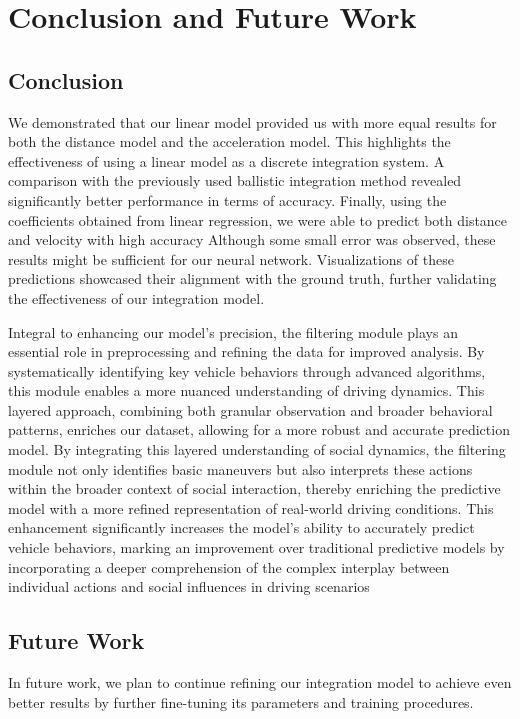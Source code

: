 \section{Conclusion and Future Work}

\subsection{Conclusion}
We demonstrated that our linear model provided us with more equal results for both the distance model and 
the acceleration model.
This highlights the effectiveness of using a linear model as a discrete integration system.
A comparison with the previously used ballistic integration method revealed significantly better performance in terms of accuracy.
Finally, using the coefficients obtained from linear regression, 
we were able to predict both distance and velocity with high accuracy
Although some small error was observed, these results might be sufficient for our neural network.
Visualizations of these predictions showcased their alignment with the ground truth, further validating the effectiveness of our integration model.

Integral to enhancing our model's precision, the filtering module plays an essential role in preprocessing and refining the data for improved analysis. By systematically identifying key vehicle behaviors through advanced algorithms, this module enables a more nuanced understanding of driving dynamics. This layered approach, combining both granular observation and broader behavioral patterns, enriches our dataset, allowing for a more robust and accurate prediction model. By integrating this layered understanding of social dynamics, the filtering module not only identifies basic maneuvers but also interprets these actions within the broader context of social interaction, thereby enriching the predictive model with a more refined representation of real-world driving conditions. This enhancement significantly increases the model’s ability to accurately predict vehicle behaviors, marking an improvement over traditional predictive models by incorporating a deeper comprehension of the complex interplay between individual actions and social influences in driving scenarios

\subsection{Future Work}
In future work, we plan to continue refining our integration model to achieve even better results by further fine-tuning its parameters and training procedures. 

